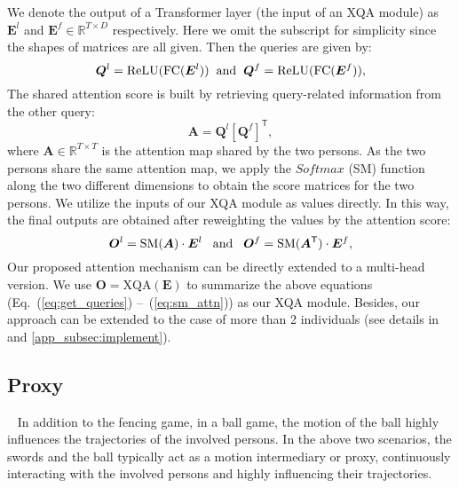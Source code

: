 \documentclass[10pt,twocolumn,letterpaper]{article}
\begin{document}
We denote the output of a Transformer layer (the input of an XQA module) as $\bm{E}^l$ and $\bm{E}^f \in \mathbb{R}^{T \times D}$ respectively. 
Here we omit the subscript for simplicity since the shapes of matrices are all given. 
Then the queries are given by:
\vskip -0.2in
\begin{equation} \label{eq:get_queries}
    \bm{Q}^l = \text{ReLU}(\text{FC}(\bm{E}^l)) \hspace{2mm}\text{and}\hspace{2mm} \bm{Q}^f = \text{ReLU}(\text{FC}(\bm{E}^f)), 
\end{equation}
\vskip -0.05in
The shared attention score is built by retrieving query-related information from the other query: 
\vskip -0.1in
\begin{equation}\label{eq:shared_attn}
    \bm{A} = \bm{Q}^l[\bm{Q}^f]^{\mathsf{T}}, 
\end{equation}
where $\bm{A} \in \mathbb{R}^{T \times T}$ is the attention map shared by the two persons.
As the two persons share the same attention map, we apply the $Softmax$ (SM) function along the two different dimensions to obtain the score matrices for the two persons. 
We utilize the inputs of our XQA module as values directly.  
In this way, the final outputs are obtained after reweighting the values by the attention score:
\vskip -0.2in
\begin{equation}\label{eq:sm_attn}
    \bm{O}^l = \text{SM}(\bm{A}) \cdot \bm{E}^l \hspace{3mm}\text{and}\hspace{3mm}  \bm{O}^f = \text{SM}(\bm{A}^{\mathsf{T}}) \cdot \bm{E}^f,
\end{equation}
\vskip -0.05in
Our proposed attention mechanism can be directly extended to a multi-head version. 
We use $\bm{O} = \text{XQA}(\bm{E})$ to summarize the above equations (Eq.~(\ref{eq:get_queries}) --~(\ref{eq:sm_attn})) as our XQA module. 
Besides, our approach can be extended to the case of more than 2 individuals (see details in  and \cref{app_subsec:implement}). 


\subsection{Proxy}~\label{subsec:proxy}
In addition to the fencing game, in a ball game, the motion of the ball highly influences the trajectories of the involved persons. 
In the above two scenarios, the swords and the ball typically act as a motion intermediary or proxy, continuously interacting with the involved persons and highly influencing their trajectories. 
\end{document}
